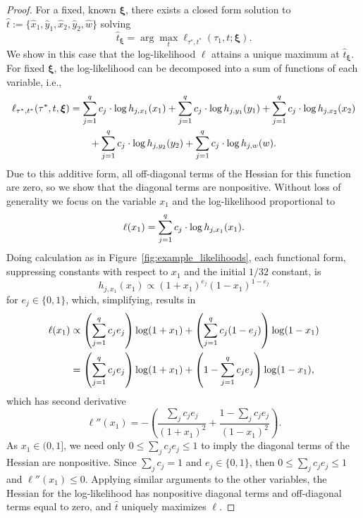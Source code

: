 \begin{proof}
For a fixed, known $\boldsymbol\xi$, there exists a closed form solution to $\hat{t} := \{\hat{x}_1,\hat{y}_1,\hat{x}_2,\hat{y}_2,\hat{w}\}$ solving
\[
\hat{t}_{\boldsymbol\xi} = \arg\max_t \ell_{\tau^*, t^*}(\tau_1, t; \boldsymbol\xi).
\]
We show in this case that the log-likelihood $\ell$ attains a unique maximum at $\hat{t}_{\boldsymbol\xi}$.
For fixed $\boldsymbol\xi$, the log-likelihood can be decomposed into a sum of functions of each variable, i.e.,
\begin{align*}
\ell_{\tau^*,t^*}(\tau^*, t, \boldsymbol\xi) &= \sum_{j=1}^q c_j\cdot\log h_{j,x_1}(x_1)+\sum_{j=1}^q c_j\cdot\log h_{j,y_1}(y_1)+\sum_{j=1}^q c_j\cdot\log h_{j,x_2}(x_2)\\
&\qquad + \sum_{j=1}^q c_j\cdot\log h_{j,y_2}(y_2)+\sum_{j=1}^q c_j\cdot\log h_{j,w}(w).
\end{align*}
Due to this additive form, all off-diagonal terms of the Hessian for this function are zero, so we show that the diagonal terms are nonpositive.
Without loss of generality we focus on the variable $x_1$ and the log-likelihood proportional to
\[
\ell(x_1) = \sum_{j=1}^q c_j\cdot\log h_{j,x_1}(x_1).
\]
Doing calculation as in Figure~\ref{fig:example_likelihoods}, each functional form, suppressing constants with respect to $x_1$ and the initial $1/32$ constant, is
\[
h_{j,x_1}(x_1) \propto (1+x_1)^{e_j}(1-x_1)^{1-e_j}
\]
for $e_j\in\{0,1\}$, which, simplifying, results in
\begin{align}
\ell(x_1) &\propto \left(\sum_{j=1}^q c_je_j\right) \log(1+x_1) + \left(\sum_{j=1}^q c_j(1-e_j)\right) \log (1-x_1)\\
                  &= \left(\sum_{j=1}^q c_je_j\right) \log(1+x_1) + \left(1-\sum_{j=1}^q c_je_j\right) \log (1-x_1), \label{eq:closed-form-x}
\end{align}
which has second derivative
\[
\ell''(x_1) = -\left(\frac{\sum_j c_je_j}{(1+x_1)^2}+\frac{1-\sum_j c_je_j}{(1-x_1)^2}\right).
\]
As $x_1\in(0,1]$, we need only $0 \le \sum_j c_je_j \le 1$ to imply the diagonal terms of the Hessian are nonpositive.
Since $\sum_j c_j = 1$ and $e_j\in\{0,1\}$, then $0 \le \sum_j c_je_j \le 1$ and $\ell''(x_1) \le 0$.
Applying similar arguments to the other variables, the Hessian for the log-likelihood has nonpositive diagonal terms and off-diagonal terms equal to zero, and $\hat{t}$ uniquely maximizes $\ell$.


\end{proof}
